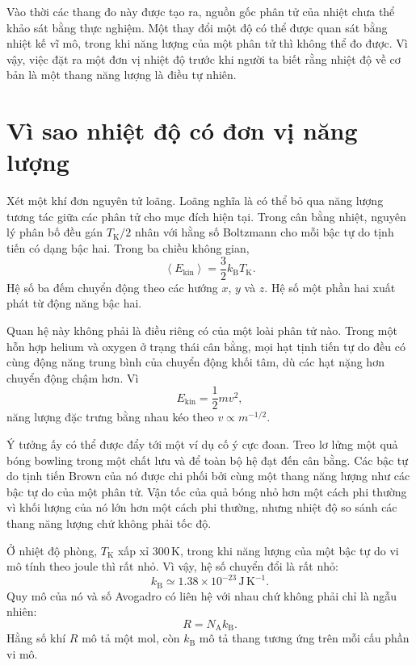 Vào thời các thang đo này được tạo ra, nguồn gốc phân tử của nhiệt chưa thể khảo sát bằng thực nghiệm. Một thay đổi một độ có thể được quan sát bằng nhiệt kế vĩ mô, trong khi năng lượng của một phân tử thì không thể đo được. Vì vậy, việc đặt ra một đơn vị nhiệt độ trước khi người ta biết rằng nhiệt độ về cơ bản là một thang năng lượng là điều tự nhiên.

\section{Vì sao nhiệt độ có đơn vị năng lượng}

Xét một khí đơn nguyên tử loãng. Loãng nghĩa là có thể bỏ qua năng lượng tương tác giữa các phân tử cho mục đích hiện tại. Trong cân bằng nhiệt, nguyên lý phân bố đều gán \(T_{\mathrm K}/2\) nhân với hằng số Boltzmann cho mỗi bậc tự do tịnh tiến có dạng bậc hai. Trong ba chiều không gian,
\begin{equation}
 \left\langle E_{\mathrm{kin}}\right\rangle
 =\frac{3}{2}k_{\mathrm B}T_{\mathrm K}.
 \label{eq:sm2-equipartition-kelvin}
\end{equation}
Hệ số ba đếm chuyển động theo các hướng \(x\), \(y\) và \(z\). Hệ số một phần hai xuất phát từ động năng bậc hai.

Quan hệ này không phải là điều riêng có của một loài phân tử nào. Trong một hỗn hợp helium và oxygen ở trạng thái cân bằng, mọi hạt tịnh tiến tự do đều có cùng động năng trung bình của chuyển động khối tâm, dù các hạt nặng hơn chuyển động chậm hơn. Vì
\begin{equation}
 E_{\mathrm{kin}}=\frac{1}{2}mv^2,
\end{equation}
năng lượng đặc trưng bằng nhau kéo theo \(v\propto m^{-1/2}\).

Ý tưởng ấy có thể được đẩy tới một ví dụ cố ý cực đoan. Treo lơ lửng một quả bóng bowling trong một chất lưu và để toàn bộ hệ đạt đến cân bằng. Các bậc tự do tịnh tiến Brown của nó được chi phối bởi cùng một thang năng lượng như các bậc tự do của một phân tử. Vận tốc của quả bóng nhỏ hơn một cách phi thường vì khối lượng của nó lớn hơn một cách phi thường, nhưng nhiệt độ so sánh các thang năng lượng chứ không phải tốc độ.

Ở nhiệt độ phòng, \(T_{\mathrm K}\) xấp xỉ \(300\,\mathrm K\), trong khi năng lượng của một bậc tự do vi mô tính theo joule thì rất nhỏ. Vì vậy, hệ số chuyển đổi là rất nhỏ:
\begin{equation}
 k_{\mathrm B}\simeq 1.38\times10^{-23}\,
 \mathrm{J\,K^{-1}}.
 \label{eq:sm2-boltzmann-value}
\end{equation}
Quy mô của nó và số Avogadro có liên hệ với nhau chứ không phải chỉ là ngẫu nhiên:
\begin{equation}
 R=N_{\mathrm A}k_{\mathrm B}.
\end{equation}
Hằng số khí \(R\) mô tả một mol, còn \(k_{\mathrm B}\) mô tả thang tương ứng trên mỗi cấu phần vi mô.


